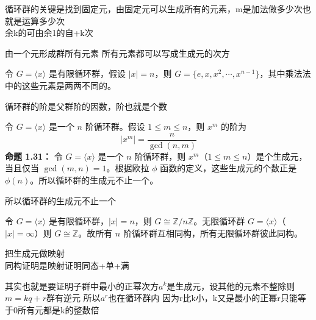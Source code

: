 \begin{note}[循环群 1]
循环群的关键是找到固定元，由固定元可以生成所有的元素，m是加法做多少次也就是运算多少次 \\
余k的可由余1的自+k次
\end{note}

\begin{note}[循环群 2]
由一个元形成群所有元素 所有元素都可以写成生成元的次方
\end{note}

\begin{proposition}[命题 1.26：有限循环群的结构]
令 $G=\langle x\rangle$ 是有限循环群，假设 $|x|=n$，则 $G=\{e,x,x^2,\cdots,x^{n-1}\}$，其中乘法法中的这些元素是两两不同的。
\end{proposition}

\begin{note}[循环子群]
循环群的阶是父群阶的因数，阶也就是个数
\end{note}

\begin{proposition}[命题 1.30：循环群的生成元]
令 $G=\langle x\rangle$ 是一个 $n$ 阶循环群。假设 $1\le m\le n$，则 $x^m$ 的阶为
\[
|x^m|=\frac{n}{\gcd(n,m)}
\]
\textbf{命题 1.31：} 令 $G=\langle x\rangle$ 是一个 $n$ 阶循环群，则 $x^m$（$1\le m\le n$）是个生成元，当且仅当 $\gcd(m,n)=1$。根据欧拉 $\phi$ 函数的定义，这些生成元的个数正是 $\phi(n)$。所以循环群的生成元不止一个。
\end{proposition}

\begin{note}[命题1 30循环群的生成元的幂指数和循环群阶数互素]
所以循环群的生成元不止一个
\end{note}

\begin{proposition}
令 $G=\langle x\rangle$ 是有限循环群，$|x|=n$，则 $G\cong\mathbb{Z}/n\mathbb{Z}$。无限循环群 $G=\langle x\rangle$（$|x|=\infty$）则 $G\cong\mathbb{Z}$。故所有 $n$ 阶循环群互相同构，所有无限循环群彼此同构。
\end{proposition}

\begin{note}[循环群的同构]
把生成元做映射 \\
同构证明是映射证明同态+单+满
\end{note}

\begin{note}[循环群的子群还是循环群]
其实也就是要证明子群中最小的正幂次方$a^k$是生成元，设其他的元素不整除则$m=kq+r$群有逆元 所以$a^r$也在循环群内 因为r比k小，k又是最小的正幂r只能等于0所有元都是k的整数倍
\end{note}

